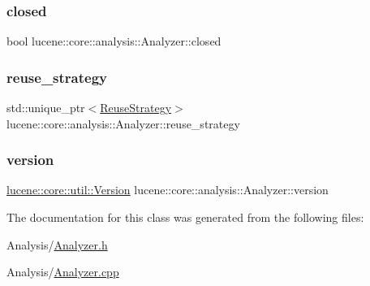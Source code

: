 \subsubsection{\texorpdfstring{closed}{closed}}
{\footnotesize\ttfamily bool lucene\+::core\+::analysis\+::\+Analyzer\+::closed\hspace{0.3cm}{\ttfamily [private]}}

\mbox{\label{classlucene_1_1core_1_1analysis_1_1Analyzer_a8c0924436e0392015b0b3df59d35717c}} 
\subsubsection{\texorpdfstring{reuse\+\_\+strategy}{reuse\_strategy}}
{\footnotesize\ttfamily std\+::unique\+\_\+ptr$<$\mbox{\hyperlink{classlucene_1_1core_1_1analysis_1_1Analyzer_1_1ReuseStrategy}{Reuse\+Strategy}}$>$ lucene\+::core\+::analysis\+::\+Analyzer\+::reuse\+\_\+strategy\hspace{0.3cm}{\ttfamily [private]}}

\mbox{\label{classlucene_1_1core_1_1analysis_1_1Analyzer_ab22f6dcf3510458172e2167ddf85fdd8}} 
\subsubsection{\texorpdfstring{version}{version}}
{\footnotesize\ttfamily \mbox{\hyperlink{classlucene_1_1core_1_1util_1_1Version}{lucene\+::core\+::util\+::\+Version}} lucene\+::core\+::analysis\+::\+Analyzer\+::version\hspace{0.3cm}{\ttfamily [private]}}



The documentation for this class was generated from the following files\+:\begin{DoxyCompactItemize}
\item 
Analysis/\mbox{\hyperlink{Analyzer_8h}{Analyzer.\+h}}\item 
Analysis/\mbox{\hyperlink{Analyzer_8cpp}{Analyzer.\+cpp}}\end{DoxyCompactItemize}
